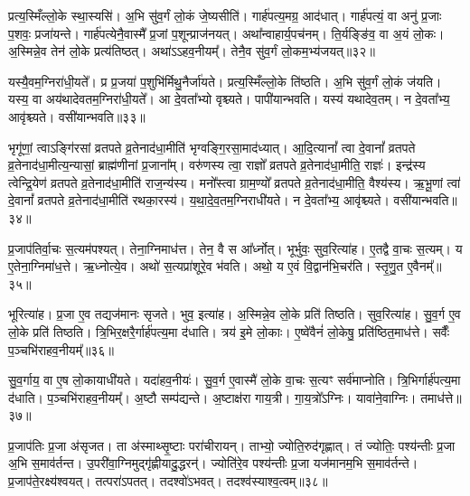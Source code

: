 प्रत्य॒स्मिँल्लो॒के स्था॒स्यसि॑।
अ॒भि सु॑व॒र्गं लो॒कं जे॒ष्यसीति॑।
गार्\mbox{}ह॑पत्य॒मग्र॒ आद॑धात्।
गार्\mbox{}ह॑पत्यं॒ वा अनु॑ प्र॒जाः प॒शवः॒ प्रजा॑यन्ते।
गार्\mbox{}ह॑पत्येनै॒वास्मै᳚ प्र॒जां प॒शून्प्राज॑नयत्।
अथा᳚न्वाहार्य॒\-पच॑नम्।
ति॒र्यङ्ङि॑व॒ वा अ॒यं लो॒कः।
अ॒स्मिन्ने॒व तेन॑ लो॒के प्रत्य॑तिष्ठत्।
अथा॑ऽऽहव॒नीयम्᳚।
तेनै॒व सु॑व॒र्गं लो॒कम॒भ्य॑जयत्॥३२॥

यस्यै॒वम॒ग्निरा॑धी॒यते᳚।
प्र प्र॒जया॑ प॒शुभि॑र्मिथु॒नैर्जा॑यते।
प्रत्य॒स्मिँल्लो॒के ति॑ष्ठति।
अ॒भि सु॑व॒र्गं लो॒कं ज॑यति।
यस्य॒ वा अय॑थादेवतम॒ग्निरा॑धी॒यते᳚।
आ दे॒वता᳚भ्यो वृश्च्यते।
पापी॑यान्भवति।
यस्य॑ यथादेव॒तम्।
न दे॒वता᳚भ्य॒ आवृ॑श्च्यते।
वसी॑यान्भवति॥३३॥

भृगू॑णां॒ त्वा\-ऽङ्गि॑रसां व्रतपते व्र॒तेनाद॑धा॒मीति॑ भृग्वङ्गि॒रसा॒\-माद॑ध्यात्।
आ॒दि॒त्यानां᳚ त्वा दे॒वानां᳚ व्रतपते व्र॒तेनाद॑धा॒मी\-त्य॒न्यासां॒ ब्राह्म॑णीनां प्र॒जाना᳚म्।
वरु॑णस्य त्वा॒ राज्ञो᳚ व्रतपते व्र॒तेनाद॑धा॒मीति॒ राज्ञः॑।
इन्द्र॑स्य त्वेन्द्रि॒येण॑ व्रतपते व्र॒तेनाद॑धा॒मीति॑ राज॒न्य॑स्य।
मनो᳚स्त्वा ग्राम॒ण्यो᳚ व्रतपते व्र॒तेनाद॑धा॒मीति॒ वैश्य॑स्य।
ऋ॒भू॒णां त्वा॑ दे॒वानां᳚ व्रतपते व्र॒तेनाद॑धा॒मीति॑ रथका॒रस्य॑।
य॒था॒दे॒व॒तम॒ग्निराधी॑यते।
न दे॒वता᳚भ्य॒ आवृ॑श्च्यते।
वसी॑यान्भवति॥३४॥

प्र॒जा\-प॑तिर्वा॒चः स॒त्यम॑पश्यत्।
तेना॒ग्निमाध॑त्त।
तेन॒ वै स आ᳚र्ध्नोत्।
भूर्भुवः॒ सुव॒रित्या॑ह।
ए॒तद्वै वा॒चः स॒त्यम्।
य ए॒तेना॒ग्निमा॑ध॒त्ते।
ऋ॒ध्नोत्ये॒व।
अथो॑ स॒त्यप्रा॑शूरे॒व भ॑वति।
अथो॒ य ए॒वं वि॒द्वान॑भि॒चर॑ति।
स्तृ॒णु॒त ए॒वैनम्᳚॥३५॥

भूरित्या॑ह।
प्र॒जा ए॒व तद्यज॑मानः \-सृजते।
भुव॒ इत्या॑ह।
अ॒स्मिन्ने॒व लो॒के प्रति॑ तिष्ठति।
सुव॒रित्या॑ह।
सु॒व॒र्ग ए॒व लो॒के प्रति॑ तिष्ठति।
त्रि॒भिर॒क्षरै॒र्गार्\mbox{}ह॑पत्य॒मा द॑धाति।
त्रय॑ इ॒मे लो॒काः।
ए॒ष्वे॑वैनं॑ लो॒केषु॒ प्रति॑\-ष्ठित॒माध॑त्ते।
सर्वैः᳚ प॒ञ्चभि॑राहव॒नीयम्᳚॥३६॥

सु॒व॒र्गाय॒ वा ए॒ष लो॒कायाधी॑यते।
यदा॑हव॒नीयः॑।
सु॒व॒र्ग ए॒वास्मै॑ लो॒के वा॒चः स॒त्यꣳ सर्व॑माप्नोति।
त्रि॒भिर्गार्\mbox{}ह॑पत्य॒मा द॑धाति।
प॒ञ्चभि॑राहव॒नीयम्᳚।
अ॒ष्टौ सम्प॑द्यन्ते।
अ॒ष्टाक्ष॑रा गाय॒त्री।
गा॒य॒त्रो᳚\-ऽग्निः।
यावा॑ने॒वाग्निः।
तमाध॑त्ते॥३७॥

प्र॒जा\-प॑तिः प्र॒जा अ॑\-सृजत।
ता अ॑स्माथ्सृ॒ष्टाः परा॑चीरायन्।
ताभ्यो॒ ज्योति॒रुद॑गृह्णात्।
तं ज्योतिः॒ पश्य॑न्तीः प्र॒जा अ॒भि स॒माव॑र्तन्त।
उ॒परी॑वा॒ग्निमुद्गृ॑ह्णीयादु॒द्धरन्॑।
ज्योति॑रे॒व पश्य॑न्तीः प्र॒जा यज॑मानम॒भि स॒माव॑र्तन्ते।
प्र॒जा\-प॑ते॒रक्ष्य॑श्वयत्।
तत्परा॑\-ऽपतत्।
तदश्वो॑\-ऽभवत्।
तदश्व॑स्याश्व॒त्वम्॥३८॥

